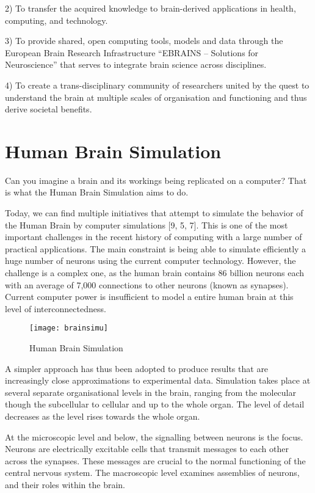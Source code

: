2) To transfer the acquired knowledge to brain-derived applications in health, computing, and technology.

3) To provide shared, open computing tools, models and data through the European Brain Research Infrastructure “EBRAINS – Solutions for Neuroscience” that serves to integrate brain science across disciplines.

4) To create a trans-disciplinary community of researchers united by the quest to understand the brain at multiple scales of organisation and functioning and thus derive societal benefits.

\section{Human Brain Simulation}

Can you imagine a brain and its workings being replicated on a computer? 
That is what the Human Brain Simulation aims to do. 


Today, we can find multiple initiatives that attempt to simulate the 
behavior of the Human Brain by computer simulations [9, 5, 7]. This is 
one of the most important challenges in the recent history of computing
with a large number of practical applications. The main constraint 
is being able to simulate efficiently a huge number of neurons using 
the current computer technology. However, the challenge is a complex one,
as the human brain contains 86 billion neurons each with an average 
of 7,000 connections to other neurons (known as synapses). 
Current computer power is insufficient to model a entire human brain
at this level of interconnectedness.

\vspace{5ex}
\begin{figure}[htbp]
    \centering
    \texttt{[image: brainsimu]}
    \label{fig:brainsimu}
    \caption{Human Brain Simulation}
\end{figure}

 
A simpler approach has thus been adopted to produce results that are 
increasingly close approximations to experimental data. Simulation
takes place at several separate organisational levels in the brain, 
ranging from the molecular though the subcellular to cellular and up 
to the whole organ. The level of detail decreases as the level rises
towards the whole organ.

At the microscopic level and below, the signalling between neurons is the
focus. Neurons are electrically excitable cells that transmit messages
to each other across the synapses. These messages are crucial to the 
normal functioning of the central nervous system. The macroscopic level
examines assemblies of neurons, and their roles within the brain.

